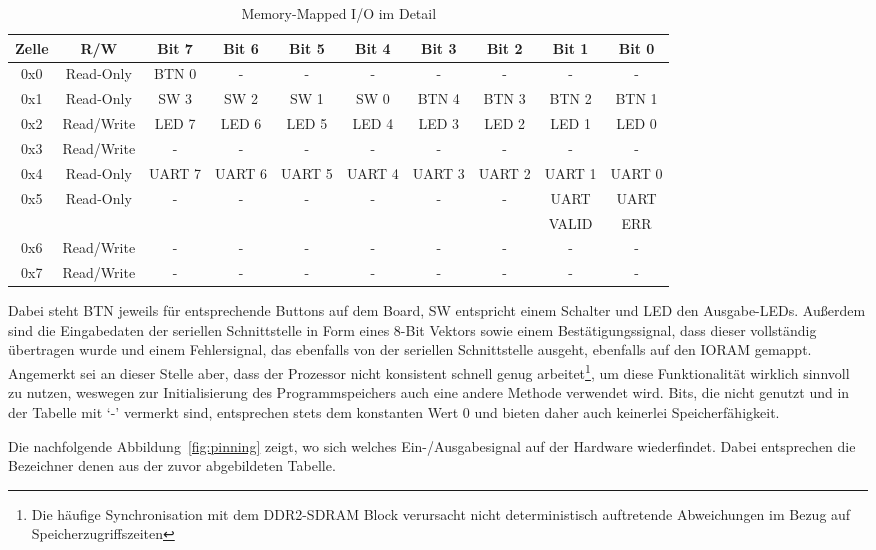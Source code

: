 \begin{table}[H]
\begin{center}
	\begin{tabular}{| c | c | c | c | c | c | c | c | c | c |}
	\hline
	Zelle & R/W & Bit 7 & Bit 6 & Bit 5 & Bit 4 & Bit 3 & Bit 2 & Bit 1 & Bit 0 \\ \hline
	0x0 & Read-Only & BTN 0 & - & - & - & - & - & - & - \\ \hline
	0x1 & Read-Only & SW 3 & SW 2 & SW 1 & SW 0 & BTN 4 & BTN 3 & BTN 2 & BTN 1 \\ \hline
	0x2 & Read/Write & LED 7 & LED 6 & LED 5 & LED 4 & LED 3 & LED 2 & LED 1 & LED 0 \\ \hline
	0x3 & Read/Write & - & - & - & - & - & - & - & - \\ \hline
	0x4 & Read-Only & UART 7 & UART 6 & UART 5 & UART 4 & UART 3 & UART 2 & UART 1 & UART 0 \\ \hline
	0x5 & Read-Only & - & - & - & - & - & - & UART & UART \\
	 &  &   &   &   &   &   &   & VALID & ERR \\ \hline
	0x6 & Read/Write & - & - & - & - & - & - & - & - \\ \hline
	0x7 & Read/Write & - & - & - & - & - & - & - & - \\ \hline
	\end{tabular}
\end{center}
\caption{Memory-Mapped I/O im Detail}
\end{table}

Dabei steht BTN jeweils f\"ur entsprechende Buttons auf dem Board, SW entspricht einem Schalter und LED den Ausgabe-LEDs. Au\ss{}erdem sind die Eingabedaten der seriellen Schnittstelle in Form eines 8-Bit Vektors sowie einem Best\"atigungssignal, dass dieser vollst\"andig \"ubertragen wurde und einem Fehlersignal, das ebenfalls von der seriellen Schnittstelle ausgeht, ebenfalls auf den IORAM gemappt. Angemerkt sei an dieser Stelle aber, dass der Prozessor nicht konsistent schnell genug arbeitet\footnote{Die h\"aufige Synchronisation mit dem DDR2-SDRAM Block verursacht nicht deterministisch auftretende Abweichungen im Bezug auf Speicherzugriffszeiten}, um diese Funktionalit\"at wirklich sinnvoll zu nutzen, weswegen zur Initialisierung des Programmspeichers auch eine andere Methode verwendet wird. Bits, die nicht genutzt und in der Tabelle mit `-' vermerkt sind, entsprechen stets dem konstanten Wert 0 und bieten daher auch keinerlei Speicherf\"ahigkeit.

Die nachfolgende Abbildung~\ref{fig:pinning} zeigt, wo sich welches Ein-/Ausgabesignal auf der Hardware wiederfindet. Dabei entsprechen die Bezeichner denen aus der zuvor abgebildeten Tabelle.

